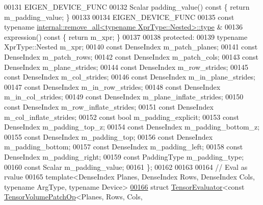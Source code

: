 \begin{DoxyCode}
00131     EIGEN\_DEVICE\_FUNC
00132     Scalar padding\_value()\textcolor{keyword}{ const }\{ \textcolor{keywordflow}{return} m\_padding\_value; \}
00133 
00134     EIGEN\_DEVICE\_FUNC
00135     \textcolor{keyword}{const} \textcolor{keyword}{typename} \hyperlink{group___sparse_core___module}{internal::remove\_all<typename XprType::Nested>::type}
      &
00136     expression()\textcolor{keyword}{ const }\{ \textcolor{keywordflow}{return} m\_xpr; \}
00137 
00138   \textcolor{keyword}{protected}:
00139     \textcolor{keyword}{typename} XprType::Nested m\_xpr;
00140     \textcolor{keyword}{const} DenseIndex m\_patch\_planes;
00141     \textcolor{keyword}{const} DenseIndex m\_patch\_rows;
00142     \textcolor{keyword}{const} DenseIndex m\_patch\_cols;
00143     \textcolor{keyword}{const} DenseIndex m\_plane\_strides;
00144     \textcolor{keyword}{const} DenseIndex m\_row\_strides;
00145     \textcolor{keyword}{const} DenseIndex m\_col\_strides;
00146     \textcolor{keyword}{const} DenseIndex m\_in\_plane\_strides;
00147     \textcolor{keyword}{const} DenseIndex m\_in\_row\_strides;
00148     \textcolor{keyword}{const} DenseIndex m\_in\_col\_strides;
00149     \textcolor{keyword}{const} DenseIndex m\_plane\_inflate\_strides;
00150     \textcolor{keyword}{const} DenseIndex m\_row\_inflate\_strides;
00151     \textcolor{keyword}{const} DenseIndex m\_col\_inflate\_strides;
00152     \textcolor{keyword}{const} \textcolor{keywordtype}{bool} m\_padding\_explicit;
00153     \textcolor{keyword}{const} DenseIndex m\_padding\_top\_z;
00154     \textcolor{keyword}{const} DenseIndex m\_padding\_bottom\_z;
00155     \textcolor{keyword}{const} DenseIndex m\_padding\_top;
00156     \textcolor{keyword}{const} DenseIndex m\_padding\_bottom;
00157     \textcolor{keyword}{const} DenseIndex m\_padding\_left;
00158     \textcolor{keyword}{const} DenseIndex m\_padding\_right;
00159     \textcolor{keyword}{const} PaddingType m\_padding\_type;
00160     \textcolor{keyword}{const} Scalar m\_padding\_value;
00161 \};
00162 
00163 
00164 \textcolor{comment}{// Eval as rvalue}
00165 \textcolor{keyword}{template}<DenseIndex Planes, DenseIndex Rows, DenseIndex Cols, \textcolor{keyword}{typename} ArgType, \textcolor{keyword}{typename} Device>
\hyperlink{struct_eigen_1_1_tensor_evaluator_3_01const_01_tensor_volume_patch_op_3_01_planes_00_01_rows_00_7868d50e868058a145e213ecbb5a830e}{00166} \textcolor{keyword}{struct }\hyperlink{struct_eigen_1_1_tensor_evaluator}{TensorEvaluator}<const \hyperlink{class_eigen_1_1_tensor_volume_patch_op}{TensorVolumePatchOp}<Planes, Rows, Cols, 

\end{DoxyCode}
